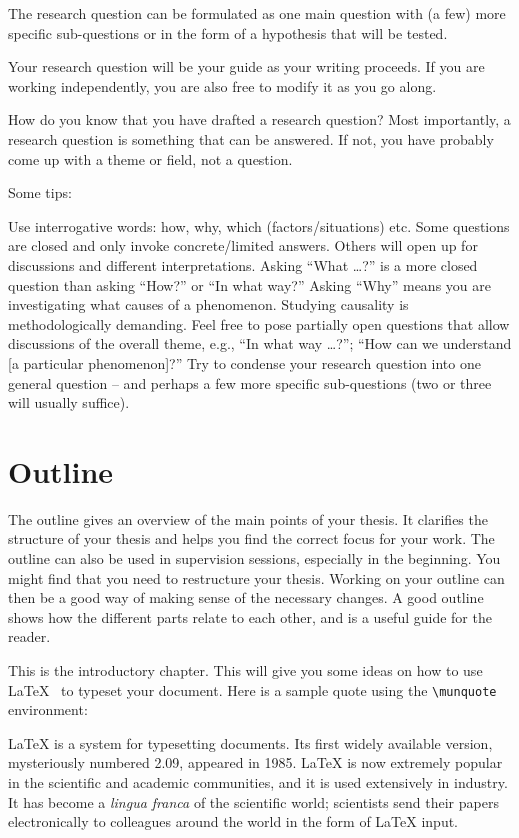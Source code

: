 The research question can be formulated as one main question with (a few) more specific sub-questions or in the form of a hypothesis that will be tested.

Your research question will be your guide as your writing proceeds. If you are working independently, you are also free to modify it as you go along.

How do you know that you have drafted a research question? Most importantly, a research question is something that can be answered. If not, you have probably come up with a theme or field, not a question.

Some tips:

Use interrogative words: how, why, which (factors/situations) etc.
Some questions are closed and only invoke concrete/limited answers. Others will open up for discussions and different interpretations.
Asking “What …?” is a more closed question than asking “How?” or “In what way?”
Asking “Why” means you are investigating what causes of a phenomenon. Studying causality is methodologically demanding.
Feel free to pose partially open questions that allow discussions of the overall theme, e.g., “In what way …?”; “How can we understand [a particular phenomenon]?”
Try to condense your research question into one general question – and perhaps a few more specific sub-questions (two or three will usually suffice).

\section{Outline}
The outline gives an overview of the main points of your thesis. It clarifies the structure of your thesis and helps you find the correct focus for your work. The outline can also be used in supervision sessions, especially in the beginning. You might find that you need to restructure your thesis. Working on your outline can then be a good way of making sense of the necessary changes. A good outline shows how the different parts relate to each other, and is a useful guide for the reader.








This is the introductory chapter.  This will give you some
ideas on how to use \LaTeX~\cite{lam1994} to typeset your document.
Here is a sample quote using the \verb+\munquote+ environment:

\begin{munquote}%
\LaTeX{} is a system for typesetting documents.  Its first widely
available version, mysteriously numbered 2.09, appeared in 1985.  \LaTeX{}
is now extremely popular in the scientific and academic communities, and
it is used extensively in industry.  It has become a \emph{lingua franca}
of the scientific world; scientists send their papers electronically to
colleagues around the world in the form of \LaTeX{} input.%
\end{munquote}

